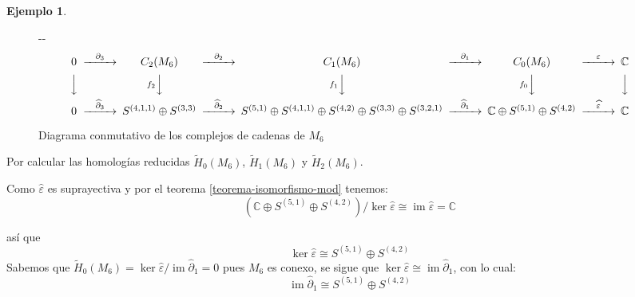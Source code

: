 \documentclass[12pt]{book}
\newlength{\offsetpage}
\newenvironment{widepage}{\begin{adjustwidth}{-\offsetpage}{-\offsetpage}%
    \addtolength{\textwidth}{2\offsetpage}}%
{\end{adjustwidth}}
\theoremstyle{definition}
\newtheorem{example}[theorem]{Ejemplo}
\DeclareMathOperator{\im}{im}
\newcounter{in}
\begin{document}
\begin{example}
  \begin{figure}[h]
    \centering
    \begin{widepage}
      \scriptsize{
        \[
        \begin{CD}
          0 @>{\partial_{3}}>> C_{2}(M_{6}) @>{\partial_{2}}>> C_{1}(M_{6}) @>{\partial_{1}}>> C_{0}(M_{6}) @>{\varepsilon}>> \mathbb{C}\\
          @VVV @Vf_{2}VV   @Vf_{1}VV  @Vf_{0}VV  @VVV    \\
          0 @>{\widehat\partial_{3}}>> S^{(4,1,1)}\oplus S^{(3,3)}
          @>{\widehat\partial_{2}}>> S^{(5,1)}\oplus S^{(4,1,1)}\oplus
          S^{(4,2)}\oplus S^{(3,3)}\oplus S^{(3,2,1)}
          @>{\widehat\partial_{1}}>> \mathbb{C} \oplus S^{(5,1)}\oplus
          S^{(4,2)} @>{\widehat \varepsilon}>> \mathbb{C}
        \end{CD}
        \]
      }
    \end{widepage}
\caption{Diagrama conmutativo de los complejos de cadenas de $M_{6}$}
\label{fig:diagrama-conmutativo6}
\end{figure}

Por calcular las homologías reducidas $\widetilde
H_{0}(M_{6})$, $\widetilde H_{1}(M_{6})$ y $\widetilde H_{2}(M_{6})$.

Como $\widehat\varepsilon$ es suprayectiva y por el teorema \ref{teorema-isomorfismo-mod} tenemos:
\begin{equation*}
  (\mathbb{C} \oplus S^{(5,1)}\oplus S^{(4,2)})/\ker\widehat\varepsilon\cong \im \widehat\varepsilon=\mathbb{C}
\end{equation*}

así que
\begin{equation*}
  \label{ker0-M6}
  \ker\widehat\varepsilon\cong  S^{(5,1)}\oplus S^{(4,2)} 
\end{equation*}
Sabemos que $\widetilde H_{0}(M_{6})=\ker \widehat\varepsilon/\im
\widehat\partial_{1}=0$ pues $M_{6}$ es conexo, se sigue que $\ker \widehat\varepsilon\cong
\im\widehat\partial_{1}$, con lo cual:
\begin{equation}
  \label{im1-M6}
  \im \widehat\partial_{1}\cong  S^{(5,1)}\oplus S^{(4,2)} 
\end{equation}


\end{example}
\end{document}
